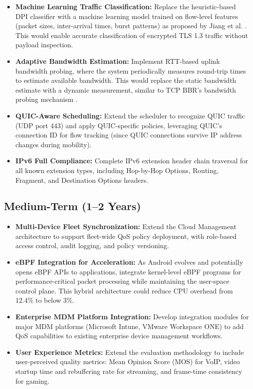 \begin{itemize}
    \item \textbf{Machine Learning Traffic Classification:} Replace the heuristic-based DPI classifier with a machine learning model trained on flow-level features (packet sizes, inter-arrival times, burst patterns) as proposed by Jiang et al. \cite{jiang_2021}. This would enable accurate classification of encrypted TLS 1.3 traffic without payload inspection.
    
    \item \textbf{Adaptive Bandwidth Estimation:} Implement RTT-based uplink bandwidth probing, where the system periodically measures round-trip times to estimate available bandwidth. This would replace the static bandwidth estimate with a dynamic measurement, similar to TCP BBR's bandwidth probing mechanism \cite{cardwell_2017}.
    
    \item \textbf{QUIC-Aware Scheduling:} Extend the scheduler to recognize QUIC traffic (UDP port 443) and apply QUIC-specific policies, leveraging QUIC's connection ID for flow tracking (since QUIC connections survive IP address changes during mobility).
    
    \item \textbf{IPv6 Full Compliance:} Complete IPv6 extension header chain traversal for all known extension types, including Hop-by-Hop Options, Routing, Fragment, and Destination Options headers.
\end{itemize}

\subsection{Medium-Term (1--2 Years)}

\begin{itemize}
    \item \textbf{Multi-Device Fleet Synchronization:} Extend the Cloud Management architecture to support fleet-wide QoS policy deployment, with role-based access control, audit logging, and policy versioning.
    
    \item \textbf{eBPF Integration for Acceleration:} As Android evolves and potentially opens eBPF APIs to applications, integrate kernel-level eBPF programs for performance-critical packet processing while maintaining the user-space control plane. This hybrid architecture could reduce CPU overhead from 12.4\% to below 3\%.
    
    \item \textbf{Enterprise MDM Platform Integration:} Develop integration modules for major MDM platforms (Microsoft Intune, VMware Workspace ONE) to add QoS capabilities to existing enterprise device management workflows.
    
    \item \textbf{User Experience Metrics:} Extend the evaluation methodology to include user-perceived quality metrics: Mean Opinion Score (MOS) for VoIP, video startup time and rebuffering rate for streaming, and frame-time consistency for gaming.
\end{itemize}

